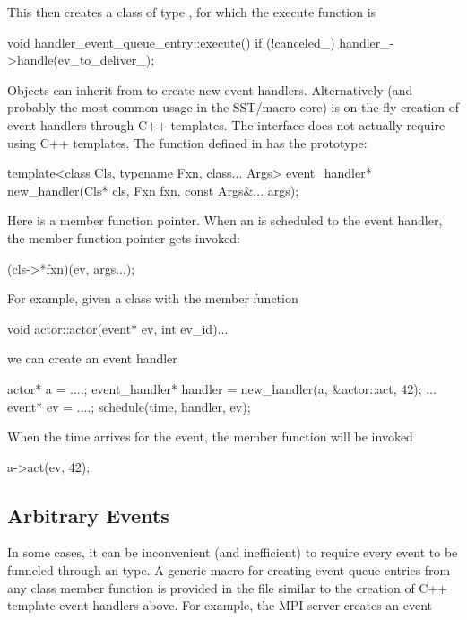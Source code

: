 This then creates a class of type , for which the execute function is

\begin{CppCode}
void handler_event_queue_entry::execute()
{
  if (!canceled_) {
    handler_->handle(ev_to_deliver_);
  }
}
\end{CppCode}

Objects can inherit from  to create new event handlers.
Alternatively (and probably the most common usage in the SST/macro core) is on-the-fly creation of event handlers through C++ templates.
The interface does not actually require using C++ templates.
The function  defined in  has the prototype:

\begin{CppCode}
template<class Cls, typename Fxn, class... Args>
event_handler*
new_handler(Cls* cls, Fxn fxn, const Args&... args);
\end{CppCode}

Here  is a member function pointer.
When an  is scheduled to the event handler, the member function pointer gets invoked:

\begin{CppCode}
(cls->*fxn)(ev, args...);
\end{CppCode}

For example, given a class  with the member function 

\begin{CppCode}
void actor::actor(event* ev, int ev_id){...}
\end{CppCode}
we can create an event handler

\begin{CppCode}
actor* a = ....;
event_handler* handler = new_handler(a, &actor::act, 42);
...
event* ev = ....;
schedule(time, handler, ev);
\end{CppCode}
When the time arrives for the event, the member function will be invoked

\begin{CppCode}
a->act(ev, 42);
\end{CppCode}

\subsection{Arbitrary Events}
In some cases, it can be inconvenient (and inefficient) to require every event to be funneled through an \evhandler type.
A generic macro for creating event queue entries from any class member function is provided in the file  similar to the creation of C++ template event handlers above.
For example, the MPI server creates an event

